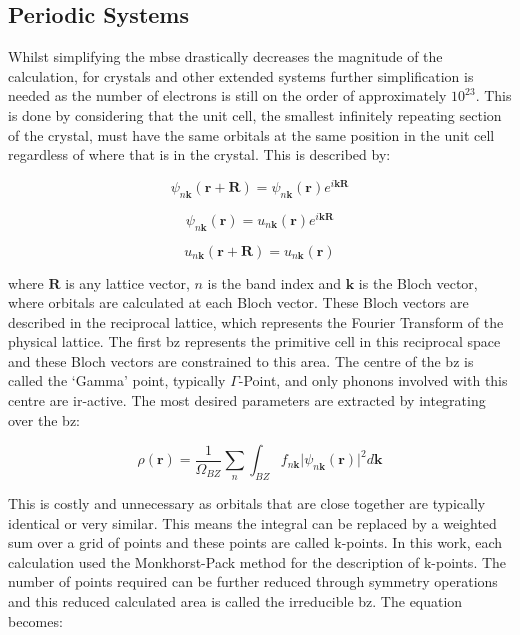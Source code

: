 \subsection{Periodic Systems}
\label{subsec:bloch}
Whilst simplifying the \acrshort{mbse} drastically decreases the magnitude of the calculation, for crystals and other extended systems further simplification is needed as the number of electrons is still on the order of approximately \(10^{23}\). This is done by considering that the unit cell, the smallest infinitely repeating section of the crystal, must have the same orbitals at the same position in the unit cell regardless of where that is in the crystal. This is described by:

\begin{equation}
\psi_{n\mathbf{k}}(\mathbf{r} + \mathbf{R}) = \psi_{n\mathbf{k}}(\mathbf{r})e^{i\mathbf{k}\mathbf{R}}
\end{equation}

\begin{equation}
\psi_{n\mathbf{k}}(\mathbf{r}) = u_{n\mathbf{k}}(\mathbf{r})e^{i\mathbf{k}\mathbf{R}}
\end{equation}

\begin{equation}
u_{n\mathbf{k}}(\mathbf{r} + \mathbf{R}) = u_{n\mathbf{k}}(\mathbf{r})
\end{equation}

where \(\mathbf{R}\) is any lattice vector, \(n\) is the band index and \(\mathbf{k}\) is the Bloch vector, where orbitals are calculated at each Bloch vector. These Bloch vectors are described in the reciprocal lattice, which represents the Fourier Transform of the physical lattice. The first \acrfull{bz} represents the primitive cell in this reciprocal space and these Bloch vectors are constrained to this area. The centre of the \acrshort{bz} is called the `Gamma' point, typically \(\Gamma\)-Point, and only phonons involved with this centre are \acrshort{ir}\nobreakdash-active. The most desired parameters are extracted by integrating over the \acrshort{bz}:

\begin{equation}
\rho(\mathbf{r}) = \frac{1}{\Omega_{BZ}} \sum_n \int_{BZ} f_{n\mathbf{k}} \lvert \psi_{n\mathbf{k}}(\mathbf{r}) \rvert^2 d\mathbf{k}
\end{equation}

This is costly and unnecessary as orbitals that are close together are typically identical or very similar. This means the integral can be replaced by a weighted sum over a grid of points and these points are called k\nobreakdash-points. In this work, each calculation used the Monkhorst-Pack \cite{Monkhorst1976} method for the description of k-points. The number of points required can be further reduced through symmetry operations and this reduced calculated area is called the irreducible \acrshort{bz}. The equation becomes: 

